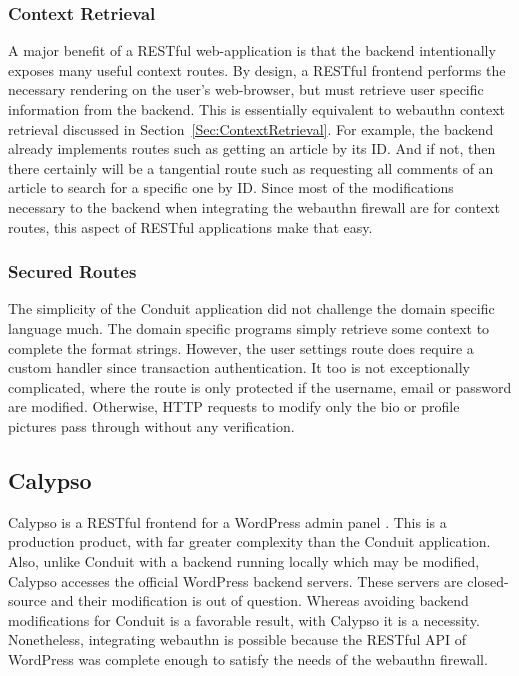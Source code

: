 \subsubsection{Context Retrieval}\label{Sec:Conduit_ContextRetrieval}

A major benefit of a RESTful web-application is that the backend intentionally exposes many useful context routes. By design, a RESTful frontend performs the necessary rendering on the user's web-browser, but must retrieve user specific information from the backend. This is essentially equivalent to webauthn context retrieval discussed in Section~\ref{Sec:ContextRetrieval}. For example, the backend already implements routes such as getting an article by its ID. And if not, then there certainly will be a tangential route such as requesting all comments of an article to search for a specific one by ID. Since most of the modifications necessary to the backend when integrating the webauthn firewall are for context routes, this aspect of RESTful applications make that easy.

\subsubsection{Secured Routes}

The simplicity of the Conduit application did not challenge the domain specific language much. The domain specific programs simply retrieve some context to complete the format strings. However, the user settings route does require a custom handler since transaction authentication. It too is not exceptionally complicated, where the route is only protected if the username, email or password are modified. Otherwise, HTTP requests to modify only the bio or profile pictures pass through without any verification.

\subsection{Calypso}

Calypso is a RESTful frontend for a WordPress admin panel \cite{TODO-calypso}. This is a production product, with far greater complexity than the Conduit application. Also, unlike Conduit with a backend running locally which may be modified, Calypso accesses the official WordPress backend servers. These servers are closed-source and their modification is out of question. Whereas avoiding backend modifications for Conduit is a favorable result, with Calypso it is a necessity. Nonetheless, integrating webauthn is possible because the RESTful API of WordPress was complete enough to satisfy the needs of the webauthn firewall.

